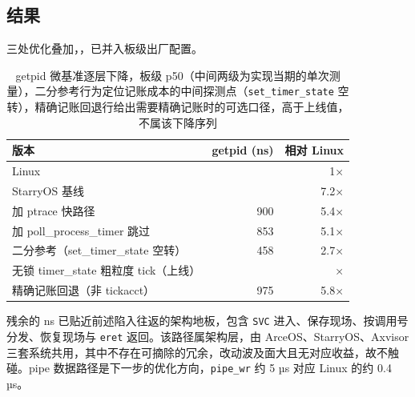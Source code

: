 \subsection{结果}

三处优化叠加，，已并入板级出厂配置。


\begin{table}[H]\centering\small
\begin{tabular}{@{}lrr@{}}
\toprule
版本 & getpid (ns) & 相对 Linux \\
\midrule
Linux & \nGetpidLin{} & 1× \\
StarryOS 基线 & \nGetpidBefore{} & 7.2× \\
加 ptrace 快路径 & 900 & 5.4× \\
加 poll\_process\_timer 跳过 & 853 & 5.1× \\
二分参考（set\_timer\_state 空转） & 458 & 2.7× \\
无锁 timer\_state 粗粒度 tick（上线） & \nGetpid{} & \nGetpidRatio{}× \\
精确记账回退（非 tickacct） & 975 & 5.8× \\
\bottomrule
\end{tabular}
\caption{getpid 微基准逐层下降，板级 p50（中间两级为实现当期的单次测量），二分参考行为定位记账成本的中间探测点（\texttt{set\_timer\_state} 空转），精确记账回退行给出需要精确记账时的可选口径，高于上线值，不属该下降序列}
\end{table}

残余的 \nGetpid{} ns 已贴近前述陷入往返的架构地板，包含 \texttt{SVC} 进入、保存现场、按调用号分发、恢复现场与 \texttt{eret} 返回。该路径属架构层，由 ArceOS、StarryOS、Axvisor 三套系统共用，其中不存在可摘除的冗余，改动波及面大且无对应收益，故不触碰。pipe 数据路径是下一步的优化方向，\texttt{pipe\_wr} 约 5 µs 对应 Linux 的约 0.4 µs。
